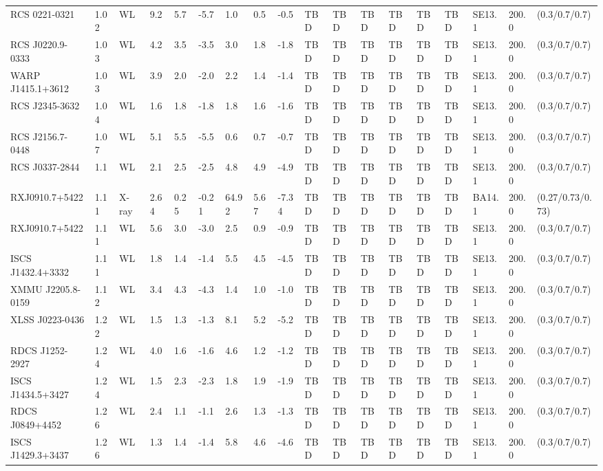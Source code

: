 \documentclass{article}
\begin{document}
\begin{center}
\begin{landscape}
\begin{longtable}{llllllllllllllllll}
RCS 0221-0321 & 1.02 & WL & 9.2 & 5.7 & -5.7 & 1.0 & 0.5 & -0.5 & TBD & TBD & TBD & TBD & TBD & TBD & SE13.1 & 200.0 & (0.3/0.7/0.7) \\
RCS J0220.9-0333 & 1.03 & WL & 4.2 & 3.5 & -3.5 & 3.0 & 1.8 & -1.8 & TBD & TBD & TBD & TBD & TBD & TBD & SE13.1 & 200.0 & (0.3/0.7/0.7) \\
WARP J1415.1+3612 & 1.03 & WL & 3.9 & 2.0 & -2.0 & 2.2 & 1.4 & -1.4 & TBD & TBD & TBD & TBD & TBD & TBD & SE13.1 & 200.0 & (0.3/0.7/0.7) \\
RCS J2345-3632 & 1.04 & WL & 1.6 & 1.8 & -1.8 & 1.8 & 1.6 & -1.6 & TBD & TBD & TBD & TBD & TBD & TBD & SE13.1 & 200.0 & (0.3/0.7/0.7) \\
RCS J2156.7-0448 & 1.07 & WL & 5.1 & 5.5 & -5.5 & 0.6 & 0.7 & -0.7 & TBD & TBD & TBD & TBD & TBD & TBD & SE13.1 & 200.0 & (0.3/0.7/0.7) \\
RCS J0337-2844 & 1.1 & WL & 2.1 & 2.5 & -2.5 & 4.8 & 4.9 & -4.9 & TBD & TBD & TBD & TBD & TBD & TBD & SE13.1 & 200.0 & (0.3/0.7/0.7) \\
RXJ0910.7+5422 & 1.11 & X-ray & 2.64 & 0.25 & -0.21 & 64.92 & 5.67 & -7.34 & TBD & TBD & TBD & TBD & TBD & TBD & BA14.1 & 200.0 & (0.27/0.73/0.73) \\
RXJ0910.7+5422 & 1.11 & WL & 5.6 & 3.0 & -3.0 & 2.5 & 0.9 & -0.9 & TBD & TBD & TBD & TBD & TBD & TBD & SE13.1 & 200.0 & (0.3/0.7/0.7) \\
ISCS J1432.4+3332 & 1.11 & WL & 1.8 & 1.4 & -1.4 & 5.5 & 4.5 & -4.5 & TBD & TBD & TBD & TBD & TBD & TBD & SE13.1 & 200.0 & (0.3/0.7/0.7) \\
XMMU J2205.8-0159 & 1.12 & WL & 3.4 & 4.3 & -4.3 & 1.4 & 1.0 & -1.0 & TBD & TBD & TBD & TBD & TBD & TBD & SE13.1 & 200.0 & (0.3/0.7/0.7) \\
XLSS J0223-0436 & 1.22 & WL & 1.5 & 1.3 & -1.3 & 8.1 & 5.2 & -5.2 & TBD & TBD & TBD & TBD & TBD & TBD & SE13.1 & 200.0 & (0.3/0.7/0.7) \\
RDCS J1252-2927 & 1.24 & WL & 4.0 & 1.6 & -1.6 & 4.6 & 1.2 & -1.2 & TBD & TBD & TBD & TBD & TBD & TBD & SE13.1 & 200.0 & (0.3/0.7/0.7) \\
ISCS J1434.5+3427 & 1.24 & WL & 1.5 & 2.3 & -2.3 & 1.8 & 1.9 & -1.9 & TBD & TBD & TBD & TBD & TBD & TBD & SE13.1 & 200.0 & (0.3/0.7/0.7) \\
RDCS J0849+4452 & 1.26 & WL & 2.4 & 1.1 & -1.1 & 2.6 & 1.3 & -1.3 & TBD & TBD & TBD & TBD & TBD & TBD & SE13.1 & 200.0 & (0.3/0.7/0.7) \\
ISCS J1429.3+3437 & 1.26 & WL & 1.3 & 1.4 & -1.4 & 5.8 & 4.6 & -4.6 & TBD & TBD & TBD & TBD & TBD & TBD & SE13.1 & 200.0 & (0.3/0.7/0.7) \\

\end{longtable}
\end{landscape}
\end{center}
\end{document}
